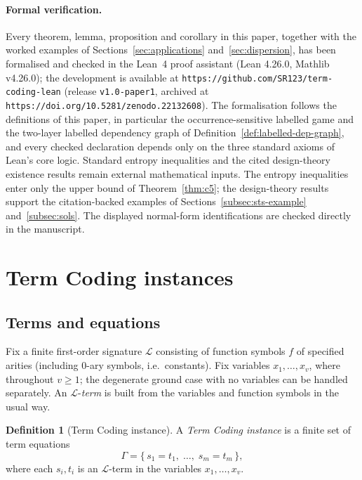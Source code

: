 \documentclass[11pt]{article}
\theoremstyle{plain}
\theoremstyle{definition}
\theoremstyle{definition}
\newtheorem{definition}[theorem]{Definition}
\theoremstyle{remark}
\begin{document}
\paragraph{Formal verification.}
Every theorem, lemma, proposition and corollary in this paper, together with the worked
examples of Sections~\ref{sec:applications} and~\ref{sec:dispersion}, has been formalised and
checked in the Lean~4 proof assistant (Lean 4.26.0, Mathlib v4.26.0); the development is
available at \nolinkurl{https://github.com/SR123/term-coding-lean} (release \texttt{v1.0-paper1},
archived at \nolinkurl{https://doi.org/10.5281/zenodo.22132608}). The formalisation follows
the definitions of this paper, in particular the occurrence-sensitive labelled game and the
two-layer labelled dependency graph of Definition~\ref{def:labelled-dep-graph}, and every
checked declaration depends only on the three standard axioms of Lean's core logic.
Standard entropy inequalities and the cited design-theory existence results remain external
mathematical inputs. The entropy inequalities enter only the upper bound of
Theorem~\ref{thm:c5}; the design-theory results support the citation-backed examples of
Sections~\ref{subsec:sts-example} and~\ref{subsec:sols}. The displayed normal-form
identifications are checked directly in the manuscript.

\section{Term Coding instances}
\label{sec:tc}

\subsection{Terms and equations}

Fix a finite first-order signature $\mathcal L$ consisting of function symbols $f$ of specified arities
(including $0$-ary symbols, i.e.\ constants).
Fix variables $x_1,\dots,x_v$, where throughout $v\ge 1$; the degenerate ground case with no variables can be
handled separately.
An $\mathcal L$-\emph{term} is built from the variables and function symbols in the usual way.

\begin{definition}[Term Coding instance]
\label{def:tc-instance}
A \emph{Term Coding instance} is a finite set of term equations
\[
\Gamma=\{\, s_1=t_1,\; \dots,\; s_m=t_m\,\},
\]
where each $s_i,t_i$ is an $\mathcal L$-term in the variables $x_1,\dots,x_v$.
\end{definition}
\end{document}
